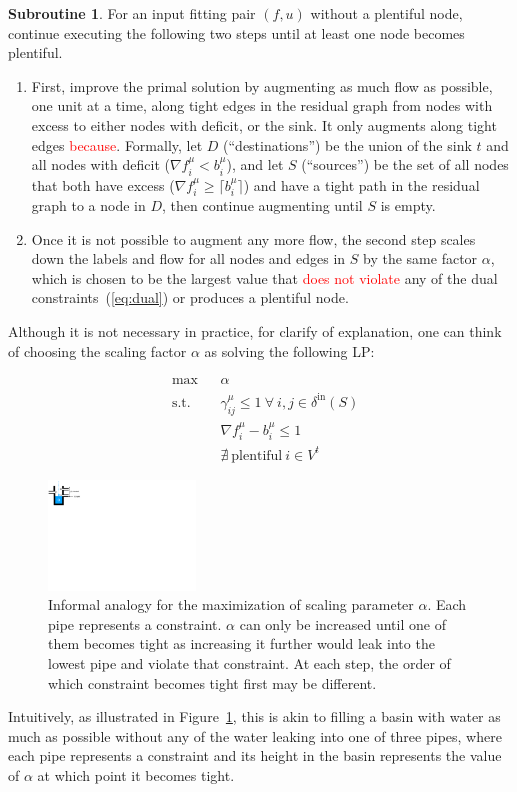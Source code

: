 \documentclass[11pt]{article}
\theoremstyle{definition}
\theoremstyle{definition}
\newtheorem{subroutine}{Subroutine}
\newcommand{\fu}{f^{\mu}}
\newcommand{\nfiu}{\nabla \fu_i}
\newcommand{\biu}{b_{i}^{\mu}}
\newcommand{\din}{\delta^{\text{in}}}
\newcommand{\vsink}{V^{t}}
\newcommand{\rewrite}[1]{\textcolor{red}{#1}}
\newcommand{\lpeq}[1] {
\begin{equation*}
\begin{aligned}
#1
\end{aligned}
\end{equation*}
}
\newcommand{\lpone}[3] {
& \underset{}{\text{#1}}
&& #2 \\
& \text{s.t.}
&& #3 
}
\newcommand{\lptwo}[4] {
\lpone{#1}{#2}{#3}\\
&&& #4
}
\newcommand{\lpthree}[5] {
\lptwo{#1}{#2}{#3}{#4}\\
&&& #5
}
\begin{document}
		\begin{subroutine}
		For an input fitting pair $(f,u)$ without a plentiful node,
		continue executing the following two steps until at least one node becomes
		plentiful.
		\begin{enumerate}
		\item First, improve the primal solution by augmenting as much flow as possible,
		one unit at a time, along tight edges in the residual graph 
		from nodes with excess to either nodes with deficit, or the sink.
		It only augments along tight edges \rewrite{because}. Formally, let
		$D$ (``destinations'') be the union of the sink $t$ and all nodes with 
		deficit ($\nabla f_i^{\mu} < b_i^{\mu}$), and let $S$ (``sources'') be
		the set of all nodes that both have excess ($\nabla f_i^{\mu} \ge \lceil b_i^{\mu} \rceil$)
		and have a tight path in the residual graph to a node in $D$, then
		continue augmenting until $S$ is empty.
		\item Once it is not possible to augment any more flow, the second step scales down
		the labels and flow for all nodes and edges in $S$ by the same factor $\alpha$,
		which is chosen to be the largest value that \rewrite{does not violate} any of the dual
		constraints~(\ref{eq:dual}) or produces a plentiful node.
		\end{enumerate}
		\end{subroutine}
		
		Although it is not necessary in practice, for clarify of explanation, one can think of choosing the scaling factor $\alpha$ as solving
		the following LP:
		\lpeq{\lpthree{max}
		{\alpha}
		{\gamma_{ij}^{\mu} \le 1\ \forall\ i,j \in \din(S)}
		{\nfiu - \biu \le 1}
		{\nexists\ \text{plentiful}\ i \in \vsink}
		}
		\begin{figure}[b!]
		\centering
		\includegraphics[width=0.35\textwidth]{figs/water.pdf}
		\caption{
		\label{fig:alpha}
		Informal analogy for the maximization of scaling parameter $\alpha$.
		Each pipe represents a constraint. $\alpha$ can only be increased until
		one of them becomes tight as increasing it further would leak into
		the lowest pipe and violate that constraint.
		At each step, the order of which constraint becomes tight first may be different.
		}
		\end{figure}
		Intuitively, as illustrated in Figure~\ref{fig:alpha}, this is akin to filling
		a basin with water as much as possible without any of the water leaking into one
		of three pipes, where each pipe represents a constraint and its height in the basin
		represents the value of $\alpha$ at which point it becomes tight.
		
\end{document}
